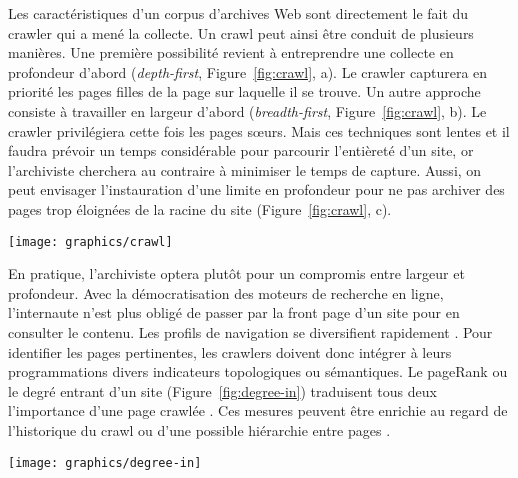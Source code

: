 \documentclass[symmetric,justified,marginals=raggedouter]{tufte-book}
\begin{document}
Les caractéristiques d'un corpus d'archives Web sont directement le fait du crawler qui a mené la collecte. Un crawl peut ainsi être conduit de plusieurs manières. Une première possibilité revient à entreprendre une collecte en profondeur d'abord (\textit{depth-first}, Figure~\ref{fig:crawl}, a). Le crawler capturera en priorité les pages filles de la page sur laquelle il se trouve. Un autre approche consiste à travailler en largeur d'abord (\textit{breadth-first}, Figure~\ref{fig:crawl}, b). Le crawler privilégiera cette fois les pages sœurs. Mais ces techniques sont lentes et il faudra prévoir un temps considérable pour parcourir l'entièreté d'un site, or l'archiviste cherchera au contraire à minimiser le temps de capture. Aussi, on peut envisager l'instauration d'une limite en profondeur pour ne pas archiver des pages trop éloignées de la racine du site (Figure~\ref{fig:crawl}, c).

\begin{figure*}%
  \texttt{[image: graphics/crawl]}
  \caption{Différentes stratégies adoptées par un crawler $c$ pour collecter les pages $\{p_1,...p_n\}$ d'un même site}
  \label{fig:crawl}
\end{figure*}

\noindent En pratique, l'archiviste optera plutôt pour un compromis entre largeur et profondeur. Avec la démocratisation des moteurs de re\-cherche en ligne, l'internaute n'est plus obligé de passer par la front page d'un site pour en consulter le contenu. Les profils de navigation se diversifient rapidement \citep{holscher_web_2000}. Pour identifier les pages pertinentes, les crawlers doivent donc intégrer à leurs programmations divers indicateurs topologiques ou sémantiques. Le pageRank \citep{page_pagerank_1999} ou le degré entrant d'un site (Figure~\ref{fig:degree-in}) traduisent tous deux l'importance d'une page crawlée \citep{cho_efficient_1998}. Ces mesures peuvent être enrichie au regard de l'historique du crawl ou d'une possible hiérarchie entre pages \citep{baeza-yates_crawling_2005}. 

\begin{marginfigure}%
  \texttt{[image: graphics/degree-in]}
  \caption{Graphe dont les nœuds sont étiquetés par degré entrant. En théorie des graphes, le degré $deg^-(v)$ d'un nœud $v$ correspond au nombre de liens incidents entrant à ce nœud.}
  \label{fig:degree-in}
\end{marginfigure} 
\end{document}
